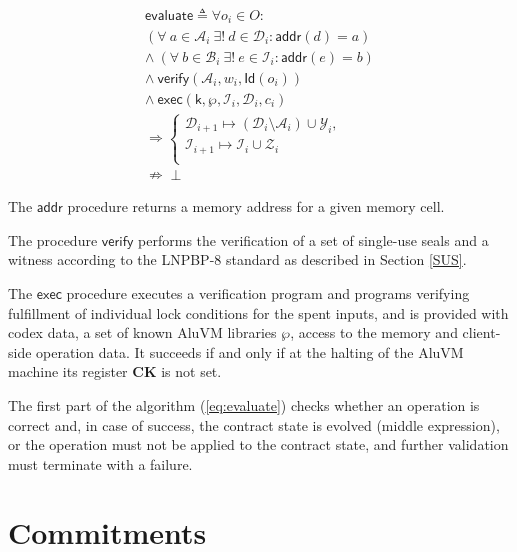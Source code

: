 \documentclass[9pt,oneside]{amsart}
\begin{document}
\begin{multicols}{2}
\begin{equation}\label{eq:evaluate}
\begin{split}
\mathsf{evaluate} \triangleq \forall o_i \in O: \\
(\forall \ a \in \mathcal{A}_i \ \exists! \ d \in \mathcal{D}_i: \mathsf{addr}(d) = a) \\
\wedge \ (\forall \ b \in \mathcal{B}_i \ \exists! \ e \in \mathcal{I}_i: \mathsf{addr}(e) = b) \\
\wedge \ \mathsf{verify}(\mathcal{A}_i, w_i, \mathsf{Id}(o_i)) \\
\wedge \ \mathsf{exec}(\mathsf{k}, \wp, \mathcal{I}_i, \mathcal{D}_i, c_i) \\
\Rightarrow 
\begin{cases}
    \mathcal{D}_{i+1} \mapsto (\mathcal{D}_i \setminus \mathcal{A}_i) \cup \mathcal{Y}_i, \\[6pt]
    \mathcal{I}_{i+1} \mapsto \mathcal{I}_i \cup \mathcal{Z}_i \\
\end{cases} \\
\nRightarrow \perp
\end{split}
\end{equation}

The $\mathsf{addr}$ procedure returns a memory address for a given memory cell.

The procedure $\mathsf{verify}$ performs the verification of a set of single-use seals and a witness
according to the LNPBP-8 standard \cite{LNPBP8} as described in Section \ref{SUS}.

The $\mathsf{exec}$ procedure executes a verification program
and programs verifying fulfillment of individual lock conditions for the spent inputs,
and is provided with codex data, a set of known AluVM libraries $\wp$,
access to the memory and client-side operation data.
It succeeds if and only if at the halting of the AluVM machine its register \textbf{CK} is not set.

The first part of the algorithm (\ref{eq:evaluate}) checks whether an operation is correct and,
in case of success, the contract state is evolved (middle expression),
or the operation must not be applied to the contract state,
and further validation must terminate with a failure.

\section{Commitments}\label{Commitments}


\end{multicols}
\end{document}

